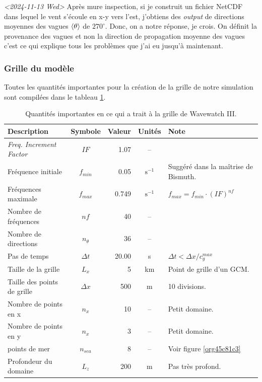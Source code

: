 \documentclass[10pt]{article}
\numberwithin{equation}{section}
\begin{document}
\textit{<2024-11-13 Wed> } Après mure inspection, si je construit un fichier NetCDF dans lequel le vent s'écoule en x-y vers l'est, j'obtiens des \emph{output} de directions moyennes des vagues \(\expval{\theta}\) de \(270^\circ\). Donc, on a notre réponse, je crois. On définit la provenance des vagues et non la direction de propagation moyenne des vagues c'est ce qui explique tous les problèmes que j'ai eu jusqu'à maintenant.
\subsubsection{Grille du modèle}
\label{sec:org873a8b3}

Toutes les quantités importantes pour la création de la grille de notre simulation sont compilées dans le tableau \ref{tab:org81d7176}. 

\begin{table}[!h]
\caption{\label{tab:org81d7176}Quantités importantes en ce qui a trait à la grille de Wavewatch III.}
\centering
\begin{tabular}{lcrcl}
\hline
\hline
Description & Symbole & Valeur & Unités & Note\\
\hline
\emph{Freq. Increment Factor} & \(IF\) & 1.07 & -- & \autocite[Voir][switch NL2]{wwiii2016user}\\
Fréquence initiale & \(f_{min}\) & 0.05 & \(\mathrm{s}^{-1}\) & Suggéré dans la maîtrise de Bismuth.\\
Fréquences maximale & \(f_{max}\) & 0.749 & \(\mathrm{s}^{-1}\) & \(f_{max} = f_{min}\cdot(IF)^{nf}\)\\
Nombre de fréquences & \(nf\) & 40 & -- & \autocite[Voir][switch NL2]{wwiii2016user}\\
Nombre de directions & \(n_\theta\) & 36 & -- & \autocite[Voir][switch NL2]{wwiii2016user}\\
Pas de temps & \(\Delta t\) & 20.00 & s & \(\Delta t < \Delta x/c^{max}_g\)\\
\hline
Taille de la grille & \(L_x\) & 5 & km & Point de grille d'un GCM.\\
Taille des points de grille & \(\Delta x\) & 500 & m & 10 divisions.\\
Nombre de points en x & \(n_x\) & 10 & -- & Petit domaine.\\
Nombre de points en y & \(n_x\) & 3 & -- & Petit domaine.\\
points de mer & \(n_{sea}\) & 8 & -- & Voir figure \ref{org45c81c3}\\
Profondeur du domaine & \(L_z\) & 200 & m & Pas très profond.\\
\hline
\end{tabular}
\end{table}
\end{document}
